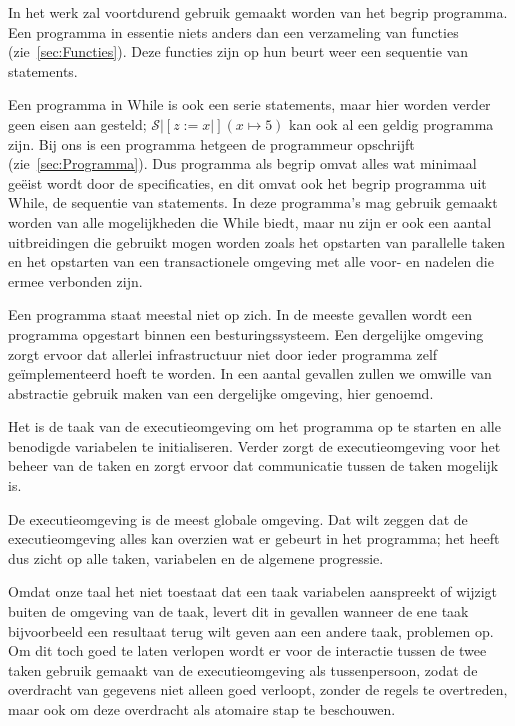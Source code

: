 In het werk zal voortdurend gebruik gemaakt worden van het begrip programma. Een programma in essentie niets anders dan
een verzameling van functies (zie~\ref{sec:Functies}). Deze functies zijn op hun beurt weer een sequentie van
statements.

Een programma in While is ook een serie statements, maar hier worden verder geen eisen aan gesteld;
\(\mathcal{S}|[z:=x|](x\mapsto5)\) kan ook al een geldig programma zijn. Bij ons is een programma hetgeen de programmeur
opschrijft (zie~\ref{sec:Programma}). Dus programma als begrip omvat alles wat minimaal ge\"eist wordt door de
specificaties, en dit omvat ook het begrip programma uit While, de sequentie van statements. In deze programma's mag
gebruik gemaakt worden van alle mogelijkheden die While biedt, maar nu zijn er ook een aantal uitbreidingen die gebruikt
mogen worden zoals het opstarten van parallelle taken en het opstarten van een transactionele omgeving met alle voor- en
nadelen die ermee verbonden zijn.


Een programma staat meestal niet op zich. In de meeste gevallen wordt een programma opgestart binnen een
besturingssysteem. Een dergelijke omgeving zorgt ervoor dat allerlei infrastructuur niet door ieder programma zelf
ge\"implementeerd hoeft te worden. In een aantal gevallen zullen we omwille van abstractie gebruik maken van een
dergelijke omgeving, hier  genoemd.

Het is de taak van de executieomgeving om het programma op te starten en alle benodigde variabelen te initialiseren.
Verder zorgt de executieomgeving voor het beheer van de taken en zorgt ervoor dat communicatie tussen de taken mogelijk
is.

De executieomgeving is de meest globale omgeving. Dat wilt zeggen dat de executieomgeving alles kan overzien wat er
gebeurt in het programma; het heeft dus zicht op alle taken, variabelen en de algemene progressie.

Omdat onze taal het niet toestaat dat een taak variabelen aanspreekt of wijzigt buiten de omgeving van de taak, levert
dit in gevallen wanneer de ene taak bijvoorbeeld een resultaat terug wilt geven aan een andere taak, problemen op. Om
dit toch goed te laten verlopen wordt er voor de interactie tussen de twee taken gebruik gemaakt van de
executieomgeving als tussenpersoon, zodat de overdracht van gegevens niet alleen goed verloopt, zonder de regels te
overtreden, maar ook om deze overdracht als atomaire stap te beschouwen.

